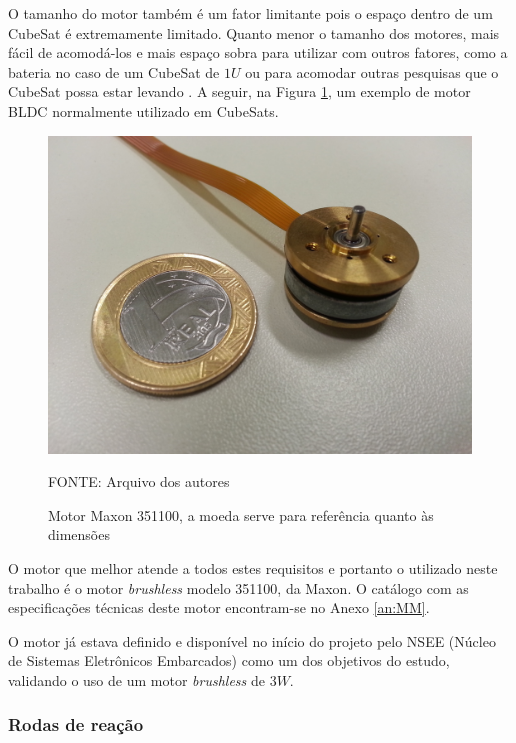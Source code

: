 \documentclass[
	12pt,				%
	openany,			%
	twoside,			%
	a4paper,			%
	english,			%
	french,				%
	spanish,			%
	brazil,				%
	oldfontcommands
	]{abntex2}
\begin{document}

O tamanho do motor também é um fator limitante pois o espaço dentro de um CubeSat é extremamente limitado. Quanto menor o tamanho dos motores, mais fácil de acomodá-los e mais espaço sobra para utilizar com outros fatores, como a bateria no caso de um CubeSat de $1U$ ou para acomodar outras pesquisas que o CubeSat possa estar levando \cite{Martins}. A seguir, na Figura \ref{fig:Maxon}, um exemplo de motor BLDC normalmente utilizado em CubeSats.

\begin{figure}[th]
	\caption{Motor Maxon 351100, a moeda serve para referência quanto às dimensões}
	\centering
	\includegraphics[width=0.8\linewidth]{./figs/Maxon_351100}
	
	\begin{small}
		FONTE: Arquivo dos autores
	\end{small}
	\label{fig:Maxon}
\end{figure}

\newpage

O motor que melhor atende a todos estes requisitos e portanto o utilizado neste trabalho é o motor \textit{brushless} modelo 351100, da Maxon. O catálogo com as especificações técnicas deste motor encontram-se no Anexo \ref{an:MM}.

O motor já estava definido e disponível no início do projeto pelo NSEE (Núcleo de Sistemas Eletrônicos Embarcados) como um dos objetivos do estudo, validando o uso de um motor \textit{brushless} de $3W$.

\subsubsection{Rodas de reação}
\end{document}
